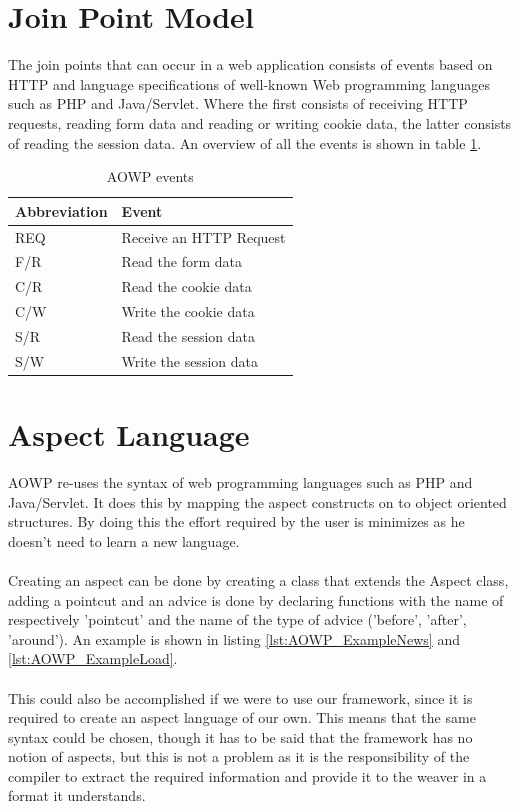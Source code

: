 \documentclass[a4paper]{report}
\begin{document}
\section{Join Point Model}
The join points that can occur in a web application consists of events based on HTTP and language specifications of well-known Web programming languages such as PHP and Java/Servlet. Where the first consists of receiving HTTP requests, reading form data and reading or writing cookie data, the latter consists of reading the session data. An overview of all the events is shown in table \ref{tab:AOWP_Events}.
\begin{table}
\centering
\begin{tabular}{l|l}
\hline
Abbreviation & Event\\
\hline
\hline
REQ & Receive an HTTP Request\\
\hline
F/R & Read the form data\\
\hline
C/R & Read the cookie data\\
\hline
C/W & Write the cookie data\\
\hline
S/R & Read the session data\\
\hline
S/W & Write the session data\\
\hline
\end{tabular}
\caption{AOWP events}
\label{tab:AOWP_Events}
\end{table}

\section{Aspect Language}
AOWP re-uses the syntax of web programming languages such as PHP and Java/Servlet. It does this by mapping the aspect constructs on to object oriented structures. By doing this the effort required by the user is minimizes as he doesn't need to learn a new language.\\
\\
Creating an aspect can be done by creating a class that extends the Aspect class, adding a pointcut and an advice is done by declaring functions with the name of respectively 'pointcut' and the name of the type of advice ('before', 'after', 'around'). An example is shown in listing \ref{lst:AOWP_ExampleNews} and \ref{lst:AOWP_ExampleLoad}.\\
\\
This could also be accomplished if we were to use our framework, since it is required to create an aspect language of our own. This means that the same syntax could be chosen, though it has to be said that the framework has no notion of aspects, but this is not a problem as it is the responsibility of the compiler to extract the required information and provide it to the weaver in a format it understands.
\end{document}

